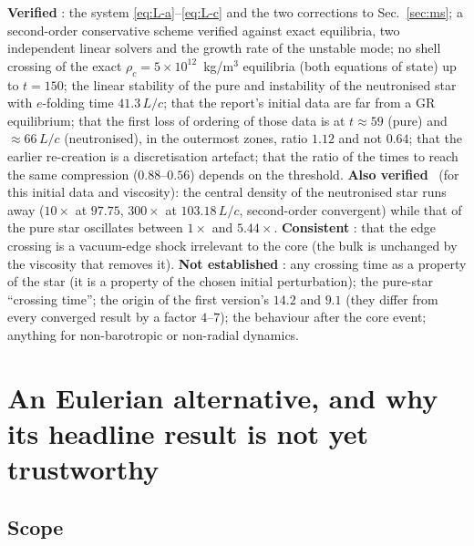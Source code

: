 \documentclass[11pt]{article}
\begin{document}
\textbf{Verified} \LP: the system \eqref{eq:L-a}--\eqref{eq:L-c} and the two corrections to Sec.~\ref{sec:ms}; a second-order conservative scheme verified against exact equilibria, two independent linear solvers and the growth rate of the unstable mode; no shell crossing of the exact $\rho_c=5\times10^{12}$~kg/m$^3$ equilibria (both equations of state) up to $t=150$; the linear stability of the pure and instability of the neutronised star with $e$-folding time $41.3\,L/c$; that the report's initial data are far from a GR equilibrium; that the first loss of ordering of those data is at $t\approx59$ (pure) and $\approx66\,L/c$ (neutronised), in the outermost zones, ratio $1.12$ and not $0.64$; that the earlier re-creation is a discretisation artefact; that the ratio of the times to reach the same compression ($0.88$--$0.56$) depends on the threshold.  \textbf{Also verified} \LP\ (for this initial data and viscosity): the central density of the neutronised star runs away ($10\times$ at $97.75$, $300\times$ at $103.18\,L/c$, second-order convergent) while that of the pure star oscillates between $1\times$ and $5.44\times$. \textbf{Consistent} \LC: that the edge crossing is a vacuum-edge shock irrelevant to the core (the bulk is unchanged by the viscosity that removes it).  \textbf{Not established} \LN: any crossing time as a property of the star (it is a property of the chosen initial perturbation); the pure-star ``crossing time''; the origin of the first version's $14.2$ and $9.1$ (they differ from every converged result by a factor $4$--$7$); the behaviour after the core event; anything for non-barotropic or non-radial dynamics.

\section{An Eulerian alternative, and why its headline result is not yet trustworthy}
\label{sec:eulerian}

\subsection{Scope}
\end{document}

